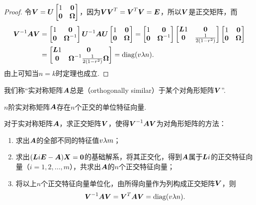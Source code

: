 \begin{theorem}
\begin{proof}
令\(\Q=\P\begin{bmatrix} 1 & \z \\ \z & \M \end{bmatrix}\)，因为\(\Q\Q^T=\Q^T\Q=\E\)，所以\(\Q\)是正交矩阵，而\begin{align*}
\Q^{-1}\A\Q
&=\begin{bmatrix}
1 & \z \\
\z & \M^{-1}
\end{bmatrix}\P^{-1}\A\P\begin{bmatrix}
1 & \z \\
\z & \M
\end{bmatrix}=\begin{bmatrix}
1 & \z \\
\z & \M^{-1}
\end{bmatrix}\begin{bmatrix}
\L1 & \z \\
\z & \B
\end{bmatrix}\begin{bmatrix}
1 & \z \\
\z & \M
\end{bmatrix} \\
&=\begin{bmatrix}
\L1 & \z \\
\z & \M^{-1}\B\M
\end{bmatrix}
=\diag(\v{\lambda}{n}).
\end{align*}
由上可知当\(n=k\)时定理也成立.
\end{proof}
\rm
我们称“实对称矩阵\(\boldsymbol{A}\)总是（{orthogonally similar}）于某个对角形矩阵\(\boldsymbol{V}\)”.
\end{theorem}

\begin{corollary}
\(n\)阶实对称矩阵\(\boldsymbol{A}\)存在\(n\)个正交的单位特征向量.
\end{corollary}

\begingroup
\color{red}
对于实对称矩阵\(\boldsymbol{A}\)，求正交矩阵\(\Q\)，使得\(\Q^{-1}\A\Q\)为对角形矩阵的方法：
\begin{enumerate}
\item 求出\(\boldsymbol{A}\)的全部不同的特征值\(v{\lambda}{m}\)；
\item 求出\((\boldsymbol{L}{i}\boldsymbol{E}-\boldsymbol{A})\boldsymbol{X}=\boldsymbol{0}\)的基础解系，将其正交化，得到\(\boldsymbol{A}\)属于\(\boldsymbol{L}{i}\)的正交特征向量（\(i=1,2,\dotsc,m\)），共求出\(\boldsymbol{A}\)的\(n\)个正交特征向量；
\item 将以上\(n\)个正交特征向量单位化，由所得向量作为列构成正交矩阵\(\Q\)，则\[
\Q^{-1}\A\Q = \Q^T \A \Q = \diag(\v{\lambda}{n}).
\]
\end{enumerate}
\endgroup

